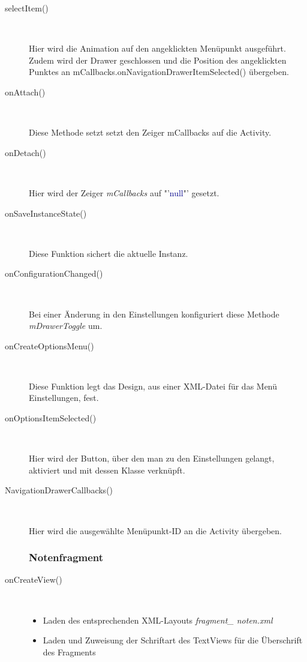 \begin{description}
\item[selectItem()]~\par
Hier wird die Animation auf den angeklickten Menüpunkt ausgeführt.
Zudem wird der Drawer geschlossen und die Position des angeklickten Punktes an mCallbacks.onNavigationDrawerItemSelected() übergeben.
 
\item[onAttach()]~\par
Diese Methode setzt setzt den Zeiger mCallbacks auf die Activity.
 
\item[onDetach()]~\par
Hier wird der Zeiger \textit{mCallbacks} auf "'\textcolor{darkblue}{null}"' gesetzt.

\item[onSaveInstanceState()]~\par
Diese Funktion sichert die aktuelle Instanz.

\item[onConfigurationChanged()]~\par
Bei einer Änderung in den Einstellungen konfiguriert diese Methode \textit{mDrawerToggle} um.
 
\item[onCreateOptionsMenu()]~\par
Diese Funktion legt das Design, aus einer XML-Datei für das Menü Einstellungen, fest.
 
\item[onOptionsItemSelected()]~\par
Hier wird der Button, über den man zu den Einstellungen gelangt, aktiviert und mit dessen Klasse verknüpft.

\item[NavigationDrawerCallbacks()]~\par
Hier wird die ausgewählte Menüpunkt-ID an die Activity übergeben.

\subsubsection{Notenfragment}
\item[onCreateView()]~\par
\begin{itemize}
\item Laden des entsprechenden XML-Layouts \textit{fragment\_ noten.xml}
\item Laden und Zuweisung der Schriftart des TextViews für die Überschrift des Fragments
\end{itemize}


\end{description}
